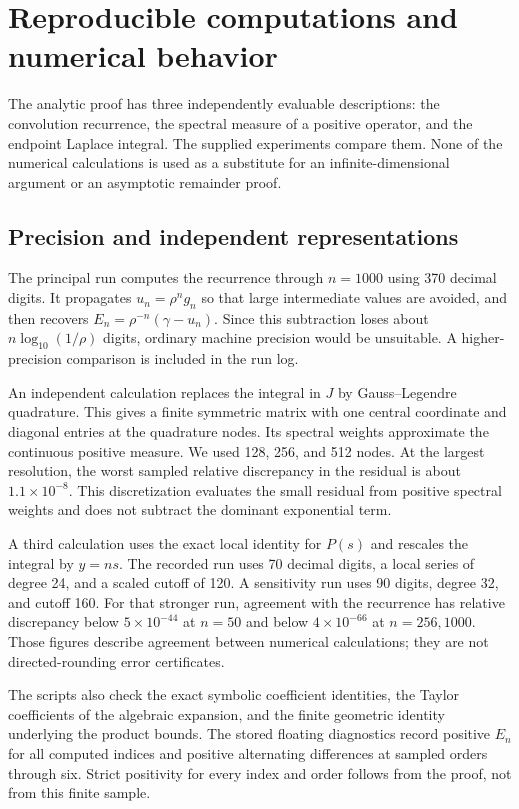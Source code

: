 \section{Reproducible computations and numerical behavior}
\label{sec:computations}

The analytic proof has three independently evaluable descriptions:
the convolution recurrence, the spectral measure of a positive operator,
and the endpoint Laplace integral. The supplied experiments compare
them. None of the numerical calculations is used as a substitute for
an infinite-dimensional argument or an asymptotic remainder proof.

\subsection{Precision and independent representations}

The principal run computes the recurrence through $n=1000$ using
370 decimal digits. It propagates $u_n=\rho^ng_n$ so that large
intermediate values are avoided, and then recovers
$E_n=\rho^{-n}(\gamma-u_n)$. Since this subtraction loses about
$n\log_{10}(1/\rho)$ digits, ordinary machine precision would be
unsuitable. A higher-precision comparison is included in the run log.

An independent calculation replaces the integral in $J$ by
Gauss--Legendre quadrature. This gives a finite symmetric matrix
with one central coordinate and diagonal entries at the quadrature
nodes. Its spectral weights approximate the continuous positive
measure. We used 128, 256, and 512 nodes. At the largest resolution,
the worst sampled relative discrepancy in the residual is about
$1.1\times10^{-8}$. This discretization evaluates the small residual
from positive spectral weights and does not subtract the dominant
exponential term.

A third calculation uses the exact local identity for $P(s)$ and
rescales the integral by $y=ns$. The recorded run uses 70 decimal
digits, a local series of degree 24, and a scaled cutoff of 120.
A sensitivity run uses 90 digits, degree 32, and cutoff 160.
For that stronger run, agreement with the recurrence has relative
discrepancy below $5\times10^{-44}$ at $n=50$ and below
$4\times10^{-66}$ at $n=256,1000$.
Those figures describe agreement between numerical calculations;
they are not directed-rounding error certificates.

The scripts also check the exact symbolic coefficient identities,
the Taylor coefficients of the algebraic expansion, and the finite
geometric identity underlying the product bounds. The stored
floating diagnostics record positive $E_n$ for all computed indices
and positive alternating differences at sampled orders through six.
Strict positivity for every index and order follows from the proof,
not from this finite sample.

